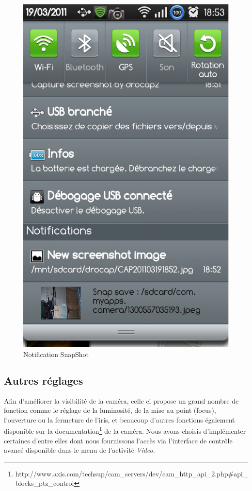 \begin{figure}[H]
  \label{notification}
  \centering
   \includegraphics[scale=0.4]{Images/notification.eps}
  \caption{Notification SnapShot}
\end{figure}  

\subsection{Autres réglages}
Afin d'améliorer la visibilité de la caméra, celle ci propose un grand nombre
de fonction comme le réglage de la luminosité, de la mise au point
(focus), l'ouverture ou la fermeture de l'iris, et beaucoup d'autres fonctions
également disponible sur la
documentation\footnote{\label{MjpegView}http://www.axis.com/techsup/cam\_servers/dev/cam\_http\_api\_2.php\#api\_blocks\_ptz\_control}
de la caméra.\newline
\indent Nous avons choisis d'implémenter certaines d'entre elles dont nous
fournissons l'accès via l'interface de contrôle avancé disponible dans le menu
de l'activité \textit{Video}.

